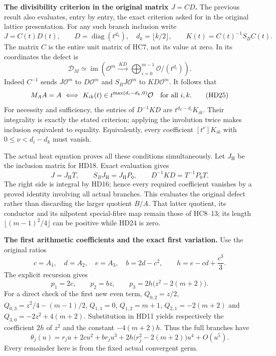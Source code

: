 \HD\textbf{The divisibility criterion in the original matrix $J=CD$.}
The previous result also evaluates, entry by entry, the exact
criterion asked for in the original lattice presentation.
For any such branch inclusion write
\[
 J=C(t)D(t),\qquad
 D=\operatorname{diag}(t^{d_k}),\quad d_k=\lfloor k/2\rfloor,
 \qquad K(t)=C(t)^{-1}S_BC(t).
 \tag{HD23}
\]
The matrix $C$ is the entire unit matrix of HC7, not its value at zero.
In its coordinates the defect is
\[
 \mathcal D_M\simeq
 \operatorname{im}\left(
  \mathcal O^m\xrightarrow{\ KD\ }
       \bigoplus_{i=0}^{m-1}\mathcal O/(t^{d_i})\right).
 \tag{HD24}\label{hd:criterion-module}
\]
Indeed $C^{-1}$ sends $J\mathcal O^m$ to $D\mathcal O^m$ and
$S_BJ\mathcal O^m$ to $KD\mathcal O^m$.
It follows that
\[
 M_AA=A
 \ \Longleftrightarrow\
 K_{ik}(t)\in t^{\max(d_i-d_k,0)}\mathcal O
          \quad\hbox{for all }i,k.
 \tag{HD25}\label{hd:criterion}
\]
For necessity and sufficiency, the entries of
$D^{-1}KD$ are $t^{d_k-d_i}K_{ik}$.
Their integrality is exactly the stated criterion; applying the
involution twice makes inclusion equivalent to equality.
Equivalently, every coefficient
$[t^\nu]K_{ik}$ with $0\le\nu<d_i-d_k$ must vanish.

The actual heat equation proves all these conditions simultaneously.
Let $J_{\mathrm H}$ be the inclusion matrix for HD18. Exact evaluation
gives
\[
 J=J_{\mathrm H}T,\qquad
 S_BJ_{\mathrm H}=J_{\mathrm H}P_0,\qquad
 D^{-1}KD=T^{-1}P_0T .
 \tag{HD26}\label{hd:Jidentity}
\]
The right side is integral by HD16; hence every required coefficient
vanishes by a proved identity involving all actual branches.
This evaluates the original defect rather than discarding the
larger quotient $B/A$. That latter quotient, its conductor and
its nilpotent special-fibre map remain those of HC8--13; its length
$\lfloor(m-1)^2/4\rfloor$ can be positive while HD24 is zero.

\HD\textbf{The first arithmetic coefficients and the exact first variation.}
Use the original ratios
\[
 c=A_1,\quad d=A_2,\quad e=A_3,\quad
 b=2d-c^2,\qquad h=e-cd+\frac{c^3}{3}.
 \tag{HD27}
\]
The explicit recursion gives
\[
 p_1=2c,\qquad p_2=bz,\qquad
 p_3=2h\bigl(z^2-2(m+2)\bigr).
 \tag{HD28}\label{hd:firstcoeffs}
\]
For a direct check of the first new even term,
$Q_{0,2}=z/2$,
$Q_{0,3}=z^2/4-(m-1)/2$,
$Q_{1,1}=0$, $Q_{1,2}=m+1$,
$Q_{2,1}=-2(m+2)$ and
$Q_{3,0}=-2z^2+4(m+2)$.
Substitution in HD11 yields respectively the coefficient
$2h$ of $z^2$ and the constant $-4(m+2)h$.
Thus the full branches have
\[
 \theta_j(u)=r_ju+2cu^2+b r_ju^3
             +2h\bigl(r_j^2-2(m+2)\bigr)u^4+O(u^5).
 \tag{HD29}
\]
Every remainder here is from the fixed actual convergent germ.

